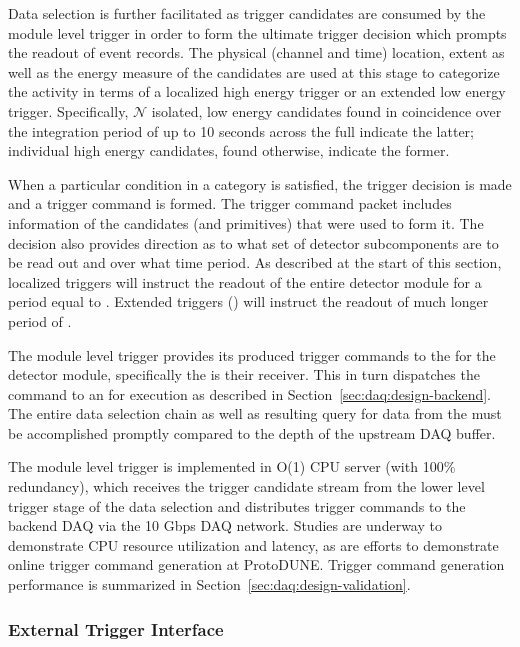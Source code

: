 Data selection is further facilitated as trigger candidates are consumed by the
module level trigger in order to form the ultimate trigger decision which
prompts the readout of event records. 
The physical (channel and time) location, extent as well as the energy measure
of the candidates are used at this stage to categorize the activity in terms of
a localized high energy trigger or an extended low energy trigger. 
Specifically, $\mathcal{N}$ isolated, low energy candidates found in coincidence
over the integration period of up to 10 seconds across the full
 indicate the latter; individual high energy candidates, found
otherwise, indicate the former.

When a particular condition in a category is satisfied, the trigger decision is
made and a trigger command is formed. 
The trigger command packet includes information of the candidates (and
primitives) that were used to form it. 
The decision also provides direction as to what set of detector subcomponents
are to be read out and over what time period. 
As described at the start of this section, localized triggers will instruct the
readout of the entire detector module for a period equal to \dpreadout.
Extended triggers () will instruct the readout of much longer period
of \snbtime.

The module level trigger provides its produced trigger commands to the
 for the detector module, specifically the  is
their receiver.
This in turn dispatches the command to an  for execution as described
in Section~\ref{sec:daq:design-backend}.
The entire data selection chain as well as resulting query for data from the
 must be accomplished promptly compared to the depth of the
upstream DAQ buffer.

The module level trigger is implemented in O(1) CPU server (with 100\%
redundancy), which receives the trigger candidate stream from the lower level
trigger stage of the data selection and distributes trigger commands to the
backend DAQ via the 10 Gbps DAQ network.
Studies are underway to demonstrate CPU resource utilization and latency, as are
efforts to demonstrate online trigger command generation at ProtoDUNE.
Trigger command generation performance is summarized in
Section~\ref{sec:daq:design-validation}.

\subsubsection{External Trigger Interface}

